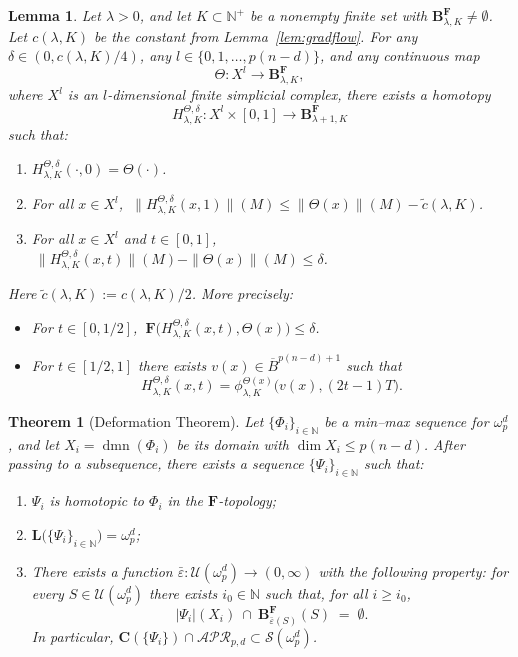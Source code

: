 \documentclass[10pt,a4paper]{amsart}
\newtheorem{lemma}{Lemma}
\newtheorem{theorem}{Theorem}
\begin{document}
\begin{lemma}\label{lem:homotopy}
Let \(\lambda>0\), and let \(K\subset \mathbb{N}^+\) be a nonempty finite set with \(\mathbf{B}^\mathbf{F}_{\lambda,K}\neq\emptyset\). Let \(c(\lambda,K)\) be the constant from Lemma~\ref{lem:gradflow}. For any \(\delta\in(0,c(\lambda,K)/4)\), any \(l\in\{0,1,\dots,p(n-d)\}\), and any continuous map
\[
\Theta:X^{l}\to \mathbf{B}^\mathbf{F}_{\lambda,K},
\]
where \(X^l\) is an \(l\)-dimensional finite simplicial complex, there exists a homotopy
\[
H^{\Theta,\delta}_{\lambda,K}:X^l\times[0,1]\to \mathbf{B}^\mathbf{F}_{\lambda+1,K}
\]
such that:
\begin{enumerate}
    \item \(H^{\Theta,\delta}_{\lambda,K}(\cdot,0)=\Theta(\cdot)\).
    \item For all \(x\in X^l\), \(\ \|H^{\Theta,\delta}_{\lambda,K}(x,1)\|(M)\le \|\Theta(x)\|(M)-\tilde c(\lambda,K)\).
    \item For all \(x\in X^l\) and \(t\in[0,1]\), \(\ \|H^{\Theta,\delta}_{\lambda,K}(x,t)\|(M)-\|\Theta(x)\|(M)\le \delta\).
\end{enumerate}
Here \(\tilde c(\lambda,K):=c(\lambda,K)/2\). More precisely:
\begin{itemize}
    \item For \(t\in[0,1/2]\), \(\ \mathbf{F}\bigl(H^{\Theta,\delta}_{\lambda,K}(x,t),\Theta(x)\bigr)\le \delta\).
    \item For \(t\in[1/2,1]\) there exists \(v(x)\in \overline{B}^{p(n-d)+1}\) such that
    \[
        H^{\Theta,\delta}_{\lambda,K}(x,t)=\phi^{\Theta(x)}_{\lambda,K}\bigl(v(x),(2t-1)T\bigr).
    \]
\end{itemize}
\end{lemma}

\begin{theorem}[Deformation Theorem]\label{Thm:deform}
Let \(\{\Phi_i\}_{i\in\mathbb N}\) be a min--max sequence for \(\omega_p^d\), and let \(X_i=\operatorname{dmn}(\Phi_i)\) be its domain with \(\dim X_i\le p(n-d)\). After passing to a subsequence, there exists a sequence \(\{\Psi_i\}_{i\in\mathbb N}\) such that:
\begin{enumerate}
    \item \(\Psi_i\) is homotopic to \(\Phi_i\) in the \(\mathbf F\)-topology;
    \item \(\mathbf L\bigl(\{\Psi_i\}_{i\in\mathbb N}\bigr)=\omega^d_p\);
    \item There exists a function \(\bar\varepsilon:\mathcal U(\omega^d_p)\to(0,\infty)\) with the following property: for every \(S\in\mathcal U(\omega^d_p)\) there exists \(i_0\in\mathbb N\) such that, for all \(i\ge i_0\),
    \[
        \bigl|\Psi_i\bigr|(X_i)\ \cap\ \mathbf B^{\mathbf F}_{\bar\varepsilon(S)}(S)\;=\;\emptyset .
    \]
    In particular, \(\mathbf C(\{\Psi_i\})\cap \mathcal{APR}_{p,d} \subset \mathcal S(\omega^d_p)\).
\end{enumerate}
\end{theorem}
\end{document}

